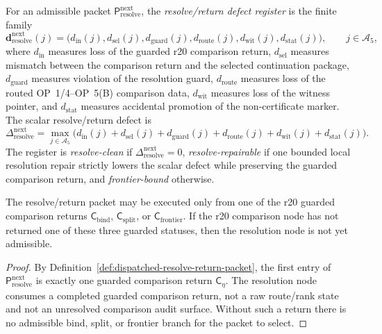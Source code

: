 \begin{definition}
\label{def:resolve-return-defect-register}
For an admissible packet \(\mathsf P_{\mathrm{resolve}}^{\mathrm{next}}\), the \emph{resolve/return defect register} is the finite family
\[
  \mathbf d_{\mathrm{resolve}}^{\mathrm{next}}(j)
  =
  \bigl(d_{\mathrm{in}}(j),d_{\mathrm{sel}}(j),d_{\mathrm{guard}}(j),
        d_{\mathrm{route}}(j),d_{\mathrm{wit}}(j),d_{\mathrm{stat}}(j)\bigr),
  \qquad j\in\mathcal A_5,
\]
where \(d_{\mathrm{in}}\) measures loss of the guarded r20 comparison return, \(d_{\mathrm{sel}}\) measures mismatch between the comparison return and the selected continuation package, \(d_{\mathrm{guard}}\) measures violation of the resolution guard, \(d_{\mathrm{route}}\) measures loss of the routed OP~1/4--OP~5(B) comparison data, \(d_{\mathrm{wit}}\) measures loss of the witness pointer, and \(d_{\mathrm{stat}}\) measures accidental promotion of the non-certificate marker.  The scalar resolve/return defect is
\[
  \Delta_{\mathrm{resolve}}^{\mathrm{next}}
  =
  \max_{j\in\mathcal A_5}
  \bigl(d_{\mathrm{in}}(j)+d_{\mathrm{sel}}(j)+d_{\mathrm{guard}}(j)+d_{\mathrm{route}}(j)+d_{\mathrm{wit}}(j)+d_{\mathrm{stat}}(j)\bigr).
\]
The register is \emph{resolve-clean} if \(\Delta_{\mathrm{resolve}}^{\mathrm{next}}=0\), \emph{resolve-repairable} if one bounded local resolution repair strictly lowers the scalar defect while preserving the guarded comparison return, and \emph{frontier-bound} otherwise.
\end{definition}

\begin{lemma}
\label{lem:guarded-comparison-return-is-resolve-precondition}
The resolve/return packet may be executed only from one of the r20 guarded comparison returns \(\mathsf C_{\mathrm{bind}}\), \(\mathsf C_{\mathrm{split}}\), or \(\mathsf C_{\mathrm{frontier}}\).  If the r20 comparison node has not returned one of these three guarded statuses, then the resolution node is not yet admissible.
\end{lemma}

\begin{proof}
By Definition~\ref{def:dispatched-resolve-return-packet}, the first entry of \(\mathsf P_{\mathrm{resolve}}^{\mathrm{next}}\) is exactly one guarded comparison return \(\mathsf C_{\eta}\).  The resolution node consumes a completed guarded comparison return, not a raw route/rank state and not an unresolved comparison audit surface.  Without such a return there is no admissible bind, split, or frontier branch for the packet to select.
\end{proof}

